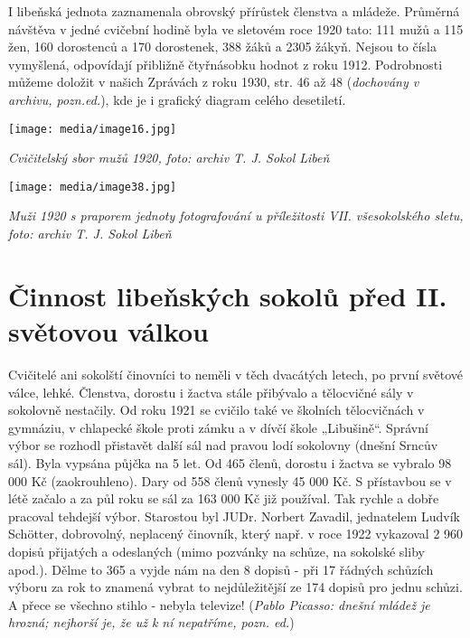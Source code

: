 I libeňská jednota zaznamenala obrovský přírůstek členstva a mládeže.
Průměrná návštěva v jedné cvičební hodině byla ve sletovém roce 1920
tato: 111 mužů a 115 žen, 160 dorostenců a 170 dorostenek, 388 žáků a
2305 žákyň. Nejsou to čísla vymyšlená, odpovídají přibližně čtyřnásobku
hodnot z roku 1912. Podrobnosti můžeme doložit v našich Zprávách z roku
1930, str. 46 až 48 (\emph{dochovány v archivu, pozn.ed.}), kde je i
grafický diagram celého desetiletí.

\texttt{[image: media/image16.jpg]}

\emph{Cvičitelský sbor mužů 1920, foto: archiv T. J. Sokol Libeň}

\texttt{[image: media/image38.jpg]}

\emph{Muži 1920 s praporem jednoty fotografování u příležitosti VII.
všesokolského sletu, foto: archiv T. J. Sokol Libeň}

\section{Činnost libeňských sokolů před II. světovou
válkou}\label{ux10dinnost-libeux148skuxfdch-sokolux16f-pux159ed-ii.-svux11btovou-vuxe1lkou}

Cvičitelé ani sokolští činovníci to neměli v těch dvacátých letech, po
první světové válce, lehké. Členstva, dorostu i žactva stále přibývalo a
tělocvičné sály v sokolovně nestačily. Od roku 1921 se cvičilo také ve
školních tělocvičnách v gymnáziu, v chlapecké škole proti zámku a v
dívčí škole „Libušině``. Správní výbor se rozhodl přistavět další sál
nad pravou lodí sokolovny (dnešní Srncův sál). Byla vypsána půjčka na 5
let. Od 465 členů, dorostu i žactva se vybralo 98 000 Kč (zaokrouhleno).
Dary od 558 členů vynesly 45 000 Kč. S přístavbou se v létě začalo a za
půl roku se sál za 163 000 Kč již používal. Tak rychle a dobře pracoval
tehdejší výbor. Starostou byl JUDr. Norbert Zavadil, jednatelem Ludvík
Schötter, dobrovolný, neplacený činovník, který např. v roce 1922
vykazoval 2 960 dopisů přijatých a odeslaných (mimo pozvánky na schůze,
na sokolské sliby apod.). Dělme to 365 a vyjde nám na den 8 dopisů - při
17 řádných schůzích výboru za rok to znamená vybrat to nejdůležitější ze
174 dopisů pro jednu schůzi. A přece se všechno stihlo - nebyla
televize! (\emph{Pablo Picasso: dnešní mládež je hrozná; nejhorší je, že
už k ní nepatříme, pozn. ed.})


